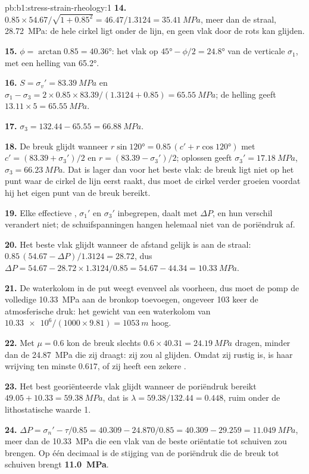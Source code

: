 \begin{solution}{pb:b1:stress-strain-rheology:1}
\textbf{14.} $0.85\times54.67/\sqrt{1 + 0.85^2} = 46.47/1.3124 =
\qty{35.41}{MPa}$, meer dan de straal, \qty{28.72}{MPa}: de hele cirkel ligt onder
de lijn, en geen vlak door de rots kan glijden.

\textbf{15.} $\phi = \arctan0.85 = \ang{40.36}$: het vlak op
$\ang{45} - \phi/2 = \ang{24.8}$ van de verticale $\sigma_1$, met een helling van
\ang{65.2}.

\textbf{16.} $S = \sigma_v' = \qty{83.39}{MPa}$ en
$\sigma_1 - \sigma_3 = 2\times0.85\times83.39/(1.3124 + 0.85) =
\qty{65.55}{MPa}$; de helling geeft $13.11\times5 = \qty{65.55}{MPa}$.

\textbf{17.} $\sigma_3 = 132.44 - 65.55 = \qty{66.88}{MPa}$.

\textbf{18.} De breuk glijdt wanneer
$r\sin\ang{120} = 0.85\,(c' + r\cos\ang{120})$ met
$c' = (83.39 + \sigma_3')/2$ en $r = (83.39 - \sigma_3')/2$; oplossen geeft
$\sigma_3' = \qty{17.18}{MPa}$, $\sigma_3 = \qty{66.23}{MPa}$. Dat is lager dan
voor het beste vlak: de breuk ligt niet op het punt waar de cirkel de lijn eerst
raakt, dus moet de cirkel verder groeien voordat hij het eigen punt van de breuk
bereikt.

\textbf{19.} Elke effectieve , $\sigma_1'$ en $\sigma_3'$
inbegrepen, daalt met $\Delta P$, en hun verschil verandert niet; de
schuifspanningen hangen helemaal niet van de poriëndruk af.

\textbf{20.} Het beste vlak glijdt wanneer de afstand gelijk is aan de straal:
$0.85\,(54.67 - \Delta P)/1.3124 = 28.72$, dus
$\Delta P = 54.67 - 28.72\times1.3124/0.85 = 54.67 - 44.34 = \qty{10.33}{MPa}$.

\textbf{21.} De waterkolom in de put weegt evenveel als voorheen, dus moet de
pomp de volledige \qty{10.33}{MPa} aan de bronkop toevoegen, ongeveer 103 keer de
atmosferische druk: het gewicht van een waterkolom van
$\num{10.33e6}/(1000\times9.81) = \qty{1053}{m}$ hoog.

\textbf{22.} Met $\mu = 0.6$ kon de breuk slechts
$0.6\times40.31 = \qty{24.19}{MPa}$ dragen, minder dan de \qty{24.87}{MPa} die zij
draagt: zij zou al glijden. Omdat zij rustig is, is haar wrijving ten minste
$0.617$, of zij heeft een zekere .

\textbf{23.} Het best georiënteerde vlak glijdt wanneer de poriëndruk bereikt
$49.05 + 10.33 = \qty{59.38}{MPa}$, dat is $\lambda = 59.38/132.44 = 0.448$,
ruim onder de lithostatische waarde 1.

\textbf{24.} $\Delta P = \sigma_n' - \tau/0.85 = 40.309 - 24.870/0.85 = 40.309 -
29.259 = \qty{11.049}{MPa}$, meer dan de \qty{10.33}{MPa} die een vlak van de beste
oriëntatie tot schuiven zou brengen. Op één decimaal is de stijging van de
poriëndruk die de breuk tot schuiven brengt
\textbf{\qty[text-series-to-math=true]{11.0}{MPa}}.
\end{solution}
